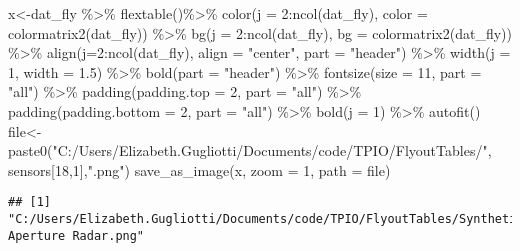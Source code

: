 \documentclass[
]{article}
\newenvironment{Shaded}{\begin{snugshade}}{\end{snugshade}}
\newcommand{\AttributeTok}[1]{\textcolor[rgb]{0.77,0.63,0.00}{#1}}
\newcommand{\DecValTok}[1]{\textcolor[rgb]{0.00,0.00,0.81}{#1}}
\newcommand{\FloatTok}[1]{\textcolor[rgb]{0.00,0.00,0.81}{#1}}
\newcommand{\FunctionTok}[1]{\textcolor[rgb]{0.00,0.00,0.00}{#1}}
\newcommand{\NormalTok}[1]{#1}
\newcommand{\OtherTok}[1]{\textcolor[rgb]{0.56,0.35,0.01}{#1}}
\newcommand{\SpecialCharTok}[1]{\textcolor[rgb]{0.00,0.00,0.00}{#1}}
\newcommand{\StringTok}[1]{\textcolor[rgb]{0.31,0.60,0.02}{#1}}
\begin{document}
\begin{Shaded}
\begin{Highlighting}[]
\NormalTok{x}\OtherTok{\textless{}{-}}\NormalTok{dat\_fly }\SpecialCharTok{\%\textgreater{}\%}
    \FunctionTok{flextable}\NormalTok{()}\SpecialCharTok{\%\textgreater{}\%}
    \FunctionTok{color}\NormalTok{(}\AttributeTok{j =} \DecValTok{2}\SpecialCharTok{:}\FunctionTok{ncol}\NormalTok{(dat\_fly), }\AttributeTok{color =} \FunctionTok{colormatrix2}\NormalTok{(dat\_fly)) }\SpecialCharTok{\%\textgreater{}\%}
    \FunctionTok{bg}\NormalTok{(}\AttributeTok{j =} \DecValTok{2}\SpecialCharTok{:}\FunctionTok{ncol}\NormalTok{(dat\_fly), }\AttributeTok{bg =} \FunctionTok{colormatrix2}\NormalTok{(dat\_fly)) }\SpecialCharTok{\%\textgreater{}\%}
    \FunctionTok{align}\NormalTok{(}\AttributeTok{j=}\DecValTok{2}\SpecialCharTok{:}\FunctionTok{ncol}\NormalTok{(dat\_fly), }\AttributeTok{align =} \StringTok{"center"}\NormalTok{, }\AttributeTok{part =} \StringTok{"header"}\NormalTok{) }\SpecialCharTok{\%\textgreater{}\%}
    \FunctionTok{width}\NormalTok{(}\AttributeTok{j =} \DecValTok{1}\NormalTok{, }\AttributeTok{width =} \FloatTok{1.5}\NormalTok{) }\SpecialCharTok{\%\textgreater{}\%}
    \FunctionTok{bold}\NormalTok{(}\AttributeTok{part =} \StringTok{"header"}\NormalTok{) }\SpecialCharTok{\%\textgreater{}\%}
    \FunctionTok{fontsize}\NormalTok{(}\AttributeTok{size =} \DecValTok{11}\NormalTok{, }\AttributeTok{part =} \StringTok{"all"}\NormalTok{) }\SpecialCharTok{\%\textgreater{}\%}
    \FunctionTok{padding}\NormalTok{(}\AttributeTok{padding.top =} \DecValTok{2}\NormalTok{, }\AttributeTok{part =} \StringTok{"all"}\NormalTok{) }\SpecialCharTok{\%\textgreater{}\%}
    \FunctionTok{padding}\NormalTok{(}\AttributeTok{padding.bottom =} \DecValTok{2}\NormalTok{, }\AttributeTok{part =} \StringTok{"all"}\NormalTok{) }\SpecialCharTok{\%\textgreater{}\%}
    \FunctionTok{bold}\NormalTok{(}\AttributeTok{j =} \DecValTok{1}\NormalTok{) }\SpecialCharTok{\%\textgreater{}\%} \FunctionTok{autofit}\NormalTok{()}
\NormalTok{file}\OtherTok{\textless{}{-}}\FunctionTok{paste0}\NormalTok{(}\StringTok{"C:/Users/Elizabeth.Gugliotti/Documents/code/TPIO/FlyoutTables/"}\NormalTok{, sensors[}\DecValTok{18}\NormalTok{,}\DecValTok{1}\NormalTok{],}\StringTok{".png"}\NormalTok{)}
\FunctionTok{save\_as\_image}\NormalTok{(x, }\AttributeTok{zoom =} \DecValTok{1}\NormalTok{, }\AttributeTok{path =}\NormalTok{ file)}
\end{Highlighting}
\end{Shaded}

\begin{verbatim}
## [1] "C:/Users/Elizabeth.Gugliotti/Documents/code/TPIO/FlyoutTables/Synthetic Aperture Radar.png"
\end{verbatim}
\end{document}
